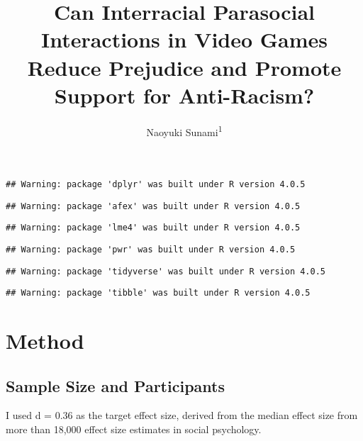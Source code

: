 \documentclass[
  english,
  man,floatsintext]{apa6}
\title{Can Interracial Parasocial Interactions in Video Games Reduce Prejudice and Promote Support for Anti-Racism?}
\author{Naoyuki Sunami\textsuperscript{1}}
\date{}
\affiliation{\vspace{0.5cm}\textsuperscript{1} University of Delaware}
\newenvironment{Shaded}{\begin{snugshade}}{\end{snugshade}}
\newcommand{\AttributeTok}[1]{\textcolor[rgb]{0.77,0.63,0.00}{#1}}
\newcommand{\DecValTok}[1]{\textcolor[rgb]{0.00,0.00,0.81}{#1}}
\newcommand{\FloatTok}[1]{\textcolor[rgb]{0.00,0.00,0.81}{#1}}
\newcommand{\FunctionTok}[1]{\textcolor[rgb]{0.00,0.00,0.00}{#1}}
\newcommand{\NormalTok}[1]{#1}
\newcommand{\OtherTok}[1]{\textcolor[rgb]{0.56,0.35,0.01}{#1}}
\newcommand{\SpecialCharTok}[1]{\textcolor[rgb]{0.00,0.00,0.00}{#1}}
\begin{document}
\maketitle

\begin{verbatim}
## Warning: package 'dplyr' was built under R version 4.0.5
\end{verbatim}

\begin{verbatim}
## Warning: package 'afex' was built under R version 4.0.5
\end{verbatim}

\begin{verbatim}
## Warning: package 'lme4' was built under R version 4.0.5
\end{verbatim}

\begin{verbatim}
## Warning: package 'pwr' was built under R version 4.0.5
\end{verbatim}

\begin{verbatim}
## Warning: package 'tidyverse' was built under R version 4.0.5
\end{verbatim}

\begin{verbatim}
## Warning: package 'tibble' was built under R version 4.0.5
\end{verbatim}

\hypertarget{method}{%
\section{Method}\label{method}}

\hypertarget{sample-size-and-participants}{%
\subsection{Sample Size and Participants}\label{sample-size-and-participants}}

I used d = 0.36 as the target effect size, derived from the median effect size from more than 18,000 effect size estimates in social psychology.

\begin{Shaded}
\end{Shaded}
\end{document}
